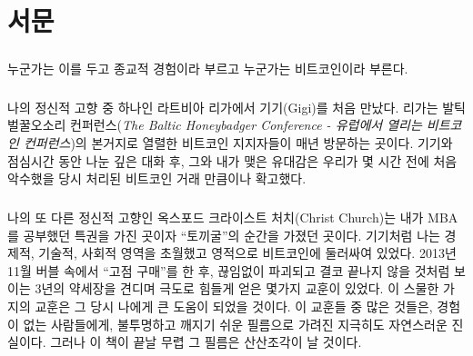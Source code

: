 \chapter*{서문}

\paragraph{}
누군가는 이를 두고 종교적 경험이라 부르고  
누군가는 비트코인이라 부른다.

\paragraph{}
나의 정신적 고향 중 하나인 라트비아 리가에서 기기(Gigi)를 처음 만났다. 리가는 발틱 벌꿀오소리 컨퍼런스(\textit{The Baltic Honeybadger Conference - 유럽에서 열리는 비트코인 컨퍼런스})의 본거지로 열렬한 비트코인 지지자들이 매년 방문하는 곳이다. 
기기와 점심시간 동안 나눈 깊은 대화 후, 그와 내가 맺은 유대감은 우리가 몇 시간 전에 처음 악수했을 당시 처리된 비트코인 거래 만큼이나 확고했다. 


\paragraph{}
나의 또 다른 정신적 고향인 옥스포드 크라이스트 처치(Christ Church)는 내가 MBA를 공부했던 특권을 가진 곳이자 \enquote{토끼굴}의 순간을 가졌던 곳이다.
기기처럼 나는 경제적, 기술적, 사회적 영역을 초월했고 영적으로 비트코인에 둘러싸여 있었다. 
2013년 11월 버블 속에서 \enquote{고점 구매}를 한 후, 끊임없이 파괴되고 결코 끝나지 않을 것처럼 보이는 3년의 약세장을 견디며 극도로 힘들게 얻은 몇가지 교훈이 있었다.
이 스물한 가지의 교훈은 그 당시 나에게 큰 도움이 되었을 것이다. 
이 교훈들 중 많은 것들은, 경험이 없는 사람들에게, 불투명하고 깨지기 쉬운 필름으로 가려진 지극히도 자연스러운 진실이다.  그러나 이 책이 끝날 무렵 그 필름은 산산조각이 날 것이다.


